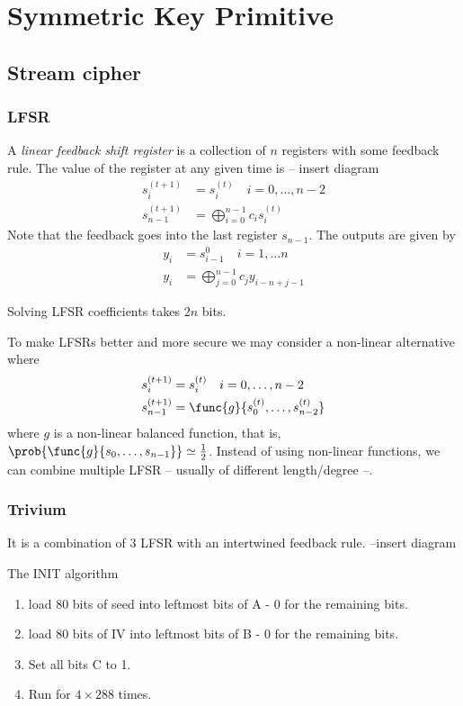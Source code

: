 \chapter{Symmetric Key Primitive}
\section{Stream cipher}
\subsection{LFSR}
A \textit{linear feedback shift register} is a collection of \(n\) registers with some feedback rule. The value of the register at any given time is
-- insert diagram
\begin{align*}
    s_i^{(t+1)} &= s_i^{(t)} \quad i = 0, \dots, n -2\\
    s_{n-1}^{(t+1)} &= \bigoplus_{i = 0}^{n-1} c_i s_i^{(t)}
\end{align*}
Note that the feedback goes into the last register \(s_{n-1}\). The outputs are given by 
\begin{align*}
    y_i &= s_{i-1}^{0} \quad i = 1 , \dots n \\
    y_i &= \bigoplus_{j = 0}^{n-1} c_j y_{i-n+j-1} 
\end{align*}
\begin{proposition}
    Solving LFSR coefficients takes \(2n\) bits.
\end{proposition}
To make LFSRs better and more secure we may consider a non-linear alternative where 
\begin{align*}
    s_i^{(t+1)} &= s_i^{(t)} \quad i = 0, \dots, n -2\\
    s_{n-1}^{(t+1)} &= \func{g}{s_{0}^{(t)} , \dots , s_{n-2}^{(t)}}
\end{align*}
where \(g\) is a non-linear balanced function, that is, \(\prob{\func{g}{s_0 , \dots , s_{n-1}}} \simeq \frac{1}{2}\). Instead of using non-linear functions, we can combine multiple LFSR -- usually of different length/degree --. 
\subsection{Trivium}
It is a combination of 3 LFSR with an intertwined feedback rule. 
--insert diagram 

The INIT algorithm 
\begin{enumerate}
    \item load 80 bits of seed into leftmost bits of A - 0 for the remaining bits.
    \item load 80 bits of IV into leftmost bits of B - 0 for the remaining bits.
    \item Set all bits C to 1.
    \item Run for \(4 \times 288\) times.
\end{enumerate}

